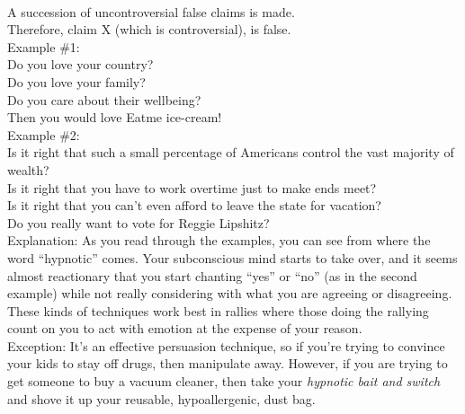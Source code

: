 \documentclass[a4paper,12pt,single,pdftex]{scrartcl}
\begin{document}
    \\

    
      A succession of uncontroversial false claims is made.
    \\

    
      Therefore, claim X (which is controversial), is false.
    \\

    
      Example \#1:
    \\

    
      Do you love your country?
    \\

    
      Do you love your family?
    \\

    
      Do you care about their wellbeing?
    \\

    
      Then you would love Eatme ice-cream!
    \\

    
      Example \#2:
    \\

    
      Is it right that such a small percentage of Americans control the vast majority of wealth?
    \\

    
      Is it right that you have to work overtime just to make ends meet?
    \\

    
      Is it right that you can’t even afford to leave the state for vacation?
    \\

    
      Do you really want to vote for Reggie Lipshitz?
    \\

    
      Explanation: As you read through the examples, you can see from where the word “hypnotic” comes.  Your subconscious mind starts to take over, and it seems almost reactionary that you start chanting “yes” or “no” (as in the second example) while not really considering with what you are agreeing or disagreeing.  These kinds of techniques work best in rallies where those doing the rallying count on you to act with emotion at the expense of your reason.
    \\

    
      Exception: It’s an effective persuasion technique, so if you're trying to convince your kids to stay off drugs, then manipulate away.  However, if you are trying to get someone to buy a vacuum cleaner, then take your {\it hypnotic bait and switch} and shove it up your reusable, hypoallergenic, dust bag.
    \\
\end{document}
